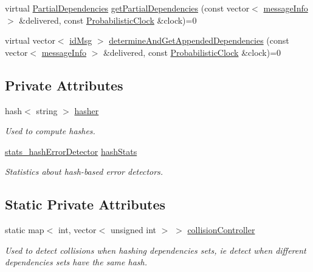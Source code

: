 \begin{DoxyCompactItemize}
\item 
virtual \hyperlink{class_partial_dependencies}{Partial\+Dependencies} \hyperlink{class_hash_error_detector_a5b9f7e8a6f63b1582e912102021c2d8d}{get\+Partial\+Dependencies} (const vector$<$ \hyperlink{structures_8h_a7e7bdc1d2fff8a9436f2f352b2711ed6}{message\+Info} $>$ \&delivered, const \hyperlink{class_probabilistic_clock}{Probabilistic\+Clock} \&clock)=0
\item 
virtual vector$<$ \hyperlink{structures_8h_a83a1d9a070efa5341da84cfd8e28d3e5}{id\+Msg} $>$ \hyperlink{class_hash_error_detector_ae45353331e29b50a0aa2fc6dd540ed4e}{determine\+And\+Get\+Appended\+Dependencies} (const vector$<$ \hyperlink{structures_8h_a7e7bdc1d2fff8a9436f2f352b2711ed6}{message\+Info} $>$ \&delivered, const \hyperlink{class_probabilistic_clock}{Probabilistic\+Clock} \&clock)=0
\end{DoxyCompactItemize}
\subsection*{Private Attributes}
\begin{DoxyCompactItemize}
\item 
hash$<$ string $>$ \hyperlink{class_hash_error_detector_a5193286d834f087e03b7299e81b60509}{hasher}
\begin{DoxyCompactList}\small\item\em Used to compute hashes. \end{DoxyCompactList}\item 
\hyperlink{_hash_error_detector_8h_afcf148bcfe372c25deda29220815b9e0}{stats\+\_\+hash\+Error\+Detector} \hyperlink{class_hash_error_detector_aec82c653679515b306b34eb075cf37fd}{hash\+Stats}
\begin{DoxyCompactList}\small\item\em Statistics about hash-\/based error detectors. \end{DoxyCompactList}\end{DoxyCompactItemize}
\subsection*{Static Private Attributes}
\begin{DoxyCompactItemize}
\item 
static map$<$ int, vector$<$ unsigned int $>$ $>$ \hyperlink{class_hash_error_detector_a662a2baf62e11d8e2468aee44b9b168e}{collision\+Controller}
\begin{DoxyCompactList}\small\item\em Used to detect collisions when hashing dependencies sets, ie detect when different dependencies sets have the same hash. \end{DoxyCompactList}\end{DoxyCompactItemize}
